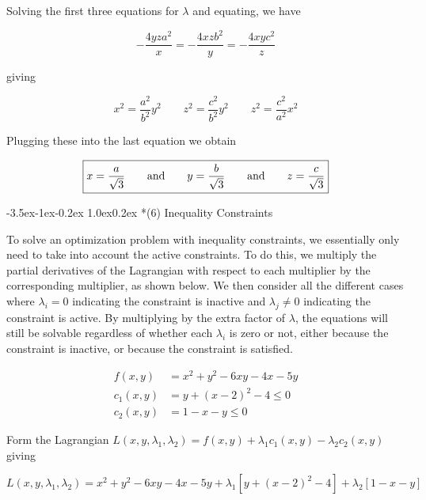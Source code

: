 \documentclass[11pt,letterpaper,onecolumn,notitlepage]{article}
\makeatletter
\renewcommand\section{\@startsection{section}{1}{\z@}%
{-3.5ex\@plus-1ex\@minus-0.2ex}%
{1.0ex\@plus0.2ex}%
{\fontsize{12pt}{12pt}\selectfont\bfseries\sffamily}}
\makeatother
\begin{document}
Solving the first three equations for $\lambda$ and equating, we have

\begin{equation*}
  -\frac{4yza^{2}}{x}=-\frac{4xzb^{2}}{y}=-\frac{4xyc^{2}}{z}
\end{equation*}

giving

\begin{equation*}
  x^{2}=\frac{a^{2}}{b^{2}}y^{2}
  \qquad
  z^{2}=\frac{c^{2}}{b^{2}}y^{2}
  \qquad
  z^{2}=\frac{c^{2}}{a^{2}}x^{2}
\end{equation*}

Plugging these into the last equation we obtain

\begin{equation*}
  \boxed{%
  x=\frac{a}{\sqrt{3}}
  \qquad\text{and}\qquad
  y=\frac{b}{\sqrt{3}}
  \qquad\text{and}\qquad
  z=\frac{c}{\sqrt{3}}}
\end{equation*}

\clearpage
\section*{(6) Inequality Constraints}

To solve an optimization problem with inequality constraints, we essentially only need to take into account the active constraints.
To do this, we multiply the partial derivatives of the Lagrangian with respect to each multiplier by the corresponding multiplier, as shown below.
We then consider all the different cases where $\lambda_{i}=0$ indicating the constraint is inactive and $\lambda_{j}\neq0$ indicating the constraint is active.
By multiplying by the extra factor of $\lambda$, the equations will still be solvable regardless of whether each $\lambda_{i}$ is zero or not, either because the constraint is inactive, or because the constraint is satisfied.

\begin{align*}
  f(x,y)&=x^{2}+y^{2}-6xy-4x-5y \\
  c_{1}(x,y)&=y+(x-2)^{2}-4\leq0 \\
  c_{2}(x,y)&=1-x-y\leq0
\end{align*}

Form the Lagrangian $L(x,y,\lambda_{1},\lambda_{2})=f(x,y)+\lambda_{1}c_{1}(x,y)-\lambda_{2}c_{2}(x,y)$ giving

\begin{equation*}
  L(x,y,\lambda_{1},\lambda_{2})=x^{2}+y^{2}-6xy-4x-5y+\lambda_{1}\left[y+(x-2)^{2}-4\right]+\lambda_{2}\left[1-x-y\right]
\end{equation*}
\end{document}
